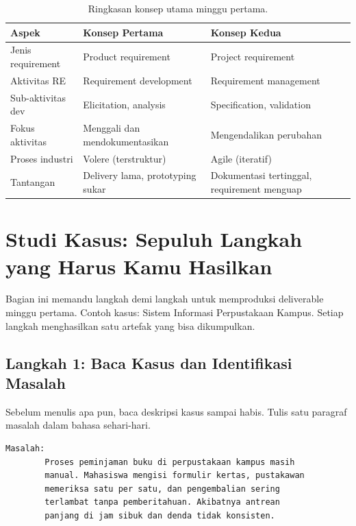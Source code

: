 \documentclass[11pt,a4paper]{article}
\begin{document}
\begin{table}[H]
	\centering
	\caption{Ringkasan konsep utama minggu pertama.}
	\label{tab:summary}
	\footnotesize
	\begin{tabularx}{\textwidth}{l X X}
		\toprule
		Aspek             & Konsep Pertama                   & Konsep Kedua                                \\
		\midrule
		Jenis requirement & Product requirement              & Project requirement                         \\
		Aktivitas RE      & Requirement development          & Requirement management                      \\
		Sub-aktivitas dev & Elicitation, analysis            & Specification, validation                   \\
		Fokus aktivitas   & Menggali dan mendokumentasikan   & Mengendalikan perubahan                     \\
		Proses industri   & Volere (terstruktur)             & Agile (iteratif)                            \\
		Tantangan         & Delivery lama, prototyping sukar & Dokumentasi tertinggal, requirement menguap \\
		\bottomrule
	\end{tabularx}
\end{table}

\section{Studi Kasus: Sepuluh Langkah yang Harus Kamu Hasilkan}

Bagian ini memandu langkah demi langkah untuk memproduksi deliverable minggu pertama. Contoh kasus: Sistem Informasi Perpustakaan Kampus. Setiap langkah menghasilkan satu artefak yang bisa dikumpulkan.

\subsection{Langkah 1: Baca Kasus dan Identifikasi Masalah}

Sebelum menulis apa pun, baca deskripsi kasus sampai habis. Tulis satu paragraf masalah dalam bahasa sehari-hari.

\begin{lstlisting}[style=out]
		Masalah:
		Proses peminjaman buku di perpustakaan kampus masih
		manual. Mahasiswa mengisi formulir kertas, pustakawan
		memeriksa satu per satu, dan pengembalian sering
		terlambat tanpa pemberitahuan. Akibatnya antrean
		panjang di jam sibuk dan denda tidak konsisten.
	\end{lstlisting}
\end{document}
